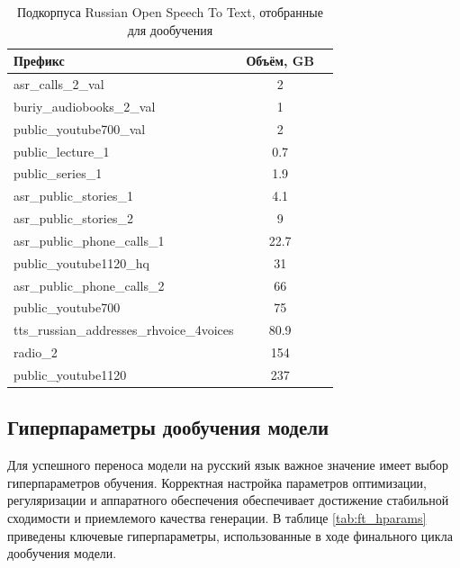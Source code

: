 \begin{table}[h!]
  \centering
  \caption{Подкорпуса Russian Open Speech To Text, отобранные для дообучения}
  \begin{tabular}{|l|c|c|}
    \hline
    \textbf{Префикс} & \textbf{Объём, GB} \\ 
    \hline
    asr\_calls\_2\_val                       & 2     \\
    buriy\_audiobooks\_2\_val                & 1     \\
    public\_youtube700\_val                  & 2     \\ 
    public\_lecture\_1                       & 0.7   \\
    public\_series\_1                        & 1.9   \\
    asr\_public\_stories\_1                  & 4.1   \\
    asr\_public\_stories\_2                  & 9     \\
    asr\_public\_phone\_calls\_1             & 22.7  \\
    public\_youtube1120\_hq                  & 31    \\
    asr\_public\_phone\_calls\_2             & 66    \\
    public\_youtube700                       & 75    \\
    tts\_russian\_addresses\_rhvoice\_4voices& 80.9  \\
    radio\_2                                 & 154   \\
    public\_youtube1120                      & 237   \\
    \hline
  \end{tabular}
  \label{tab:ru_splits}
\end{table}


\subsection{Гиперпараметры дообучения модели}

Для успешного переноса модели на русский язык важное значение имеет выбор гиперпараметров обучения.  
Корректная настройка параметров оптимизации, регуляризации и аппаратного обеспечения обеспечивает  
достижение стабильной сходимости и приемлемого качества генерации. В таблице \ref{tab:ft_hparams}  
приведены ключевые гиперпараметры, использованные в ходе финального цикла дообучения модели.

